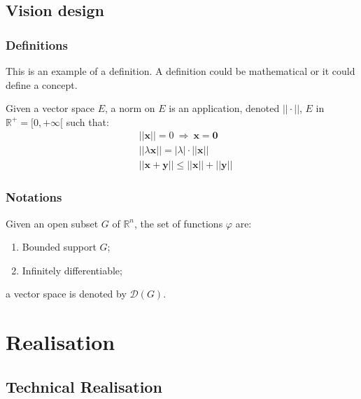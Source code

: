 \documentclass[11pt,fleqn,,a4paper,twoside,openright]{book} %
\begin{document}
\chapter{Vision design}

\section{Definitions}

This is an example of a definition. A definition could be mathematical or it could define a concept.

\begin{definition}
Given a vector space $E$, a norm on $E$ is an application, denoted $||\cdot||$, $E$ in $\mathbb{R}^+=[0,+\infty[$ such that:
\begin{align}
& ||\mathbf{x}||=0\ \Rightarrow\ \mathbf{x}=\mathbf{0}\\
& ||\lambda \mathbf{x}||=|\lambda|\cdot ||\mathbf{x}||\\
& ||\mathbf{x}+\mathbf{y}||\leq ||\mathbf{x}||+||\mathbf{y}||
\end{align}
\end{definition}


\section{Notations}

\begin{notation}
Given an open subset $G$ of $\mathbb{R}^n$, the set of functions $\varphi$ are:
\begin{enumerate}
\item Bounded support $G$;
\item Infinitely differentiable;
\end{enumerate}
a vector space is denoted by $\mathcal{D}(G)$. 
\end{notation}

\part{Realisation}

\chapter{Technical Realisation}
\end{document}
